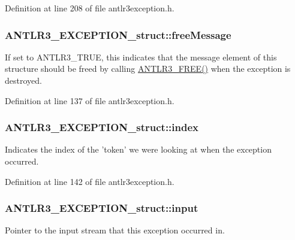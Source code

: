 Definition at line 208 of file antlr3exception.\-h.

\hypertarget{struct_a_n_t_l_r3___e_x_c_e_p_t_i_o_n__struct_aee1ea267a1e9432e0d4a8a04591a2735}{
\subsubsection[{free\-Message}]{ A\-N\-T\-L\-R3\-\_\-\-E\-X\-C\-E\-P\-T\-I\-O\-N\-\_\-struct\-::free\-Message}}\label{struct_a_n_t_l_r3___e_x_c_e_p_t_i_o_n__struct_aee1ea267a1e9432e0d4a8a04591a2735}
If set to A\-N\-T\-L\-R3\-\_\-\-T\-R\-U\-E, this indicates that the message element of this structure should be freed by calling \hyperlink{antlr3defs_8h_a6558340e5762ec9d464c2f5ff70d9b5f}{A\-N\-T\-L\-R3\-\_\-\-F\-R\-E\-E()} when the exception is destroyed. 

Definition at line 137 of file antlr3exception.\-h.

\hypertarget{struct_a_n_t_l_r3___e_x_c_e_p_t_i_o_n__struct_a4c726c30ad1a60bcea21cab002ad9e39}{
\subsubsection[{index}]{ A\-N\-T\-L\-R3\-\_\-\-E\-X\-C\-E\-P\-T\-I\-O\-N\-\_\-struct\-::index}}\label{struct_a_n_t_l_r3___e_x_c_e_p_t_i_o_n__struct_a4c726c30ad1a60bcea21cab002ad9e39}
Indicates the index of the 'token' we were looking at when the exception occurred. 

Definition at line 142 of file antlr3exception.\-h.

\hypertarget{struct_a_n_t_l_r3___e_x_c_e_p_t_i_o_n__struct_a8fb8620d51e1af5614f679dd5e5374bb}{
\subsubsection[{input}]{ A\-N\-T\-L\-R3\-\_\-\-E\-X\-C\-E\-P\-T\-I\-O\-N\-\_\-struct\-::input}}\label{struct_a_n_t_l_r3___e_x_c_e_p_t_i_o_n__struct_a8fb8620d51e1af5614f679dd5e5374bb}
Pointer to the input stream that this exception occurred in. 

